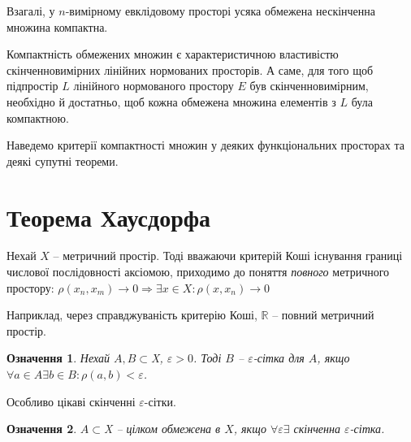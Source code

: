 \documentclass[14pt,twoside]{extreport}
\theoremstyle{mystyle}
\newtheorem{dfn}{Означення}
\numberwithin{equation}{chapter}
\begin{document}
Взагалі, у $n$-вимірному евклідовому просторі усяка обмежена нескінченна множина компактна.

Компактність обмежених множин є характеристичною властивістю скінченновимірних лінійних нормованих просторів. А саме, для того щоб підпростір $L$ лінійного нормованого простору $E$ був скінченновимірним, необхідно й достатньо, щоб кожна обмежена множина елементів з $L$ була компактною.

Наведемо критерії компактності множин у деяких функціональних просторах та деякі супутні теореми.

\section{Теорема Хаусдорфа}

Нехай $X$ -- метричний простір. Тоді вважаючи критерій Коші існування границі числової послідовності аксіомою, приходимо до поняття \emph{повного} метричного простору:
$\rho(x_n, x_m) \to 0 \Rightarrow \exists x \in X:  \rho(x, x_n) \to 0 $

Наприклад, через справджуваність критерію Коші, $\mathbb{R}$ -- повний метричний простір.

\begin{dfn} Нехай $A, B \subset $X$ $, $\varepsilon > 0 $. Тоді $B $ -- $\varepsilon$-сітка для $A$, якщо $\forall a\in A \exists b \in B:  \rho(a, b) < \varepsilon$.
\end{dfn}

Особливо цікаві скінченні $\varepsilon$-сітки.

\begin{dfn}	$A \subset $X$ $ -- цілком обмежена в $X$, якщо $\forall \varepsilon  \exists $ скінченна $\varepsilon$-сітка.
\end{dfn}
\end{document}
